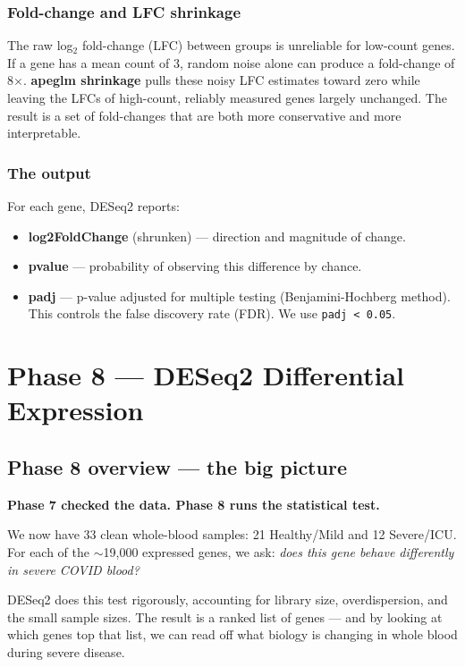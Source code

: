 \documentclass[11pt, a4paper]{article}
\begin{document}
\subsubsection*{Fold-change and LFC shrinkage}

The raw log$_2$ fold-change (LFC) between groups is unreliable for low-count genes.
If a gene has a mean count of 3, random noise alone can produce a fold-change of 8$\times$.
\textbf{apeglm shrinkage} pulls these noisy LFC estimates toward zero while leaving the
LFCs of high-count, reliably measured genes largely unchanged.
The result is a set of fold-changes that are both more conservative and more interpretable.

\subsubsection*{The output}

For each gene, DESeq2 reports:
\begin{itemize}[nosep]
  \item \textbf{log2FoldChange} (shrunken) — direction and magnitude of change.
  \item \textbf{pvalue} — probability of observing this difference by chance.
  \item \textbf{padj} — p-value adjusted for multiple testing (Benjamini-Hochberg method).
        This controls the false discovery rate (FDR). We use \texttt{padj < 0.05}.
\end{itemize}

\section{Phase 8 — DESeq2 Differential Expression}

\subsection{Phase 8 overview — the big picture}

\textbf{Phase 7 checked the data. Phase 8 runs the statistical test.}

We now have 33 clean whole-blood samples: 21 Healthy/Mild and 12 Severe/ICU.
For each of the $\sim$19,000 expressed genes, we ask:
\textit{does this gene behave differently in severe COVID blood?}

DESeq2 does this test rigorously, accounting for library size, overdispersion, and
the small sample sizes. The result is a ranked list of genes — and by looking at which
genes top that list, we can read off what biology is changing in whole blood during
severe disease.
\end{document}
